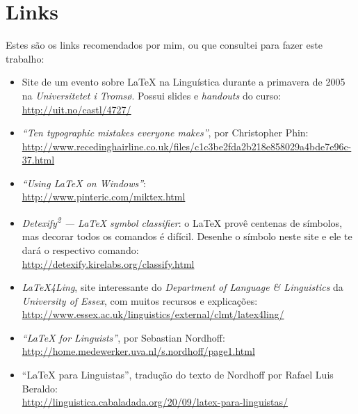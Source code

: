 \chapter{Links}

Estes são os links recomendados por mim, ou que consultei para fazer este trabalho:

\begin{itemize}
	\item Site de um evento sobre \LaTeX{} na Linguística durante a primavera de 2005 na \emph{Universitetet i Troms\o}. Possui slides e \emph{handouts} do curso:\\
	\href{http://uit.no/castl/4727/}{{\sf http://uit.no/castl/4727/}}

	\item \emph{``Ten typographic mistakes everyone makes''}, por Christopher Phin:\\
	\href{http://www.recedinghairline.co.uk/files/c1c3be2fda2b218e858029a4bde7e96c-397.html}{{\sf http://www.re\-ce\-ding\-hair\-line.co.uk/fil\-es/c1c3be2fda2b218e858029a4bde7e96c-3\-7.html}}

	\item \emph{``Using \LaTeX{} on Windows''}:\\
	\href{http://www.pinteric.com/miktex.html}{{\sf http://www.pinteric.com/miktex.html}}

	\item \emph{Detexify\textsuperscript{2} --- LaTeX symbol classifier}: o \LaTeX{} provê centenas de símbolos, mas decorar todos os comandos é difícil. Desenhe o símbolo neste site e ele te dará o respectivo comando:\\
	\href{http://detexify.kirelabs.org/classify.html}{{\sf http://detexify.kire\-labs.org/class\-ify.html}}

	\item \emph{\LaTeX4Ling}, site interessante do \emph{Department of Language \& Linguistics} da \emph{University of Essex}, com muitos recursos e explicações:\\
	\href{http://www.essex.ac.uk/linguistics/external/clmt/latex4ling/}{{\sf http://www.essex.ac.uk/lin\-guis\-tics/ex\-ternal/clmt/latex4ling/}}

	\item \emph{``\LaTeX{} for Linguists''}, por Sebastian Nordhoff:\\
	\href{http://home.medewerker.uva.nl/s.nordhoff/page1.html}{{\sf http://home.mede\-wer\-ker.uva.nl/s.nor\-d\-hoff/page1.html}}

	\item ``\LaTeX{} para Linguistas'', tradução do texto de Nordhoff por Rafael Luis Beraldo:\\
	\href{http://linguistica.ca\-ba\-la\-da\-da.org/2009/09/latex-para-linguistas/}{{\sf http://linguistica.ca\-ba\-la\-da\-da.org/20/09/latex-para-linguistas/}}


\end{itemize}
